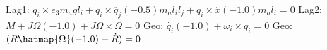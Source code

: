 
Lag1: $q_i\times e_3 m_a g l_i+q_i\times \ddot{q_j} (-0.5) m_a l_i l_j+q_i\times \ddot{x} (-1.0) m_a l_i = 0$
Lag2: $M+J \dot{\Omega } (-1.0)+J \Omega \times \Omega  = 0$
Geo: $\dot{q_i} (-1.0)+\omega _i\times q_i = 0$
Geo: $(R \hatmap{\Omega } (-1.0)+\dot{R}) = 0$